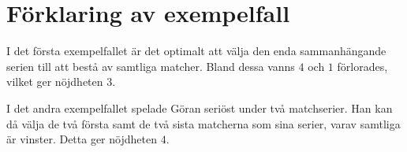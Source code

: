 \section*{Förklaring av exempelfall}
I det första exempelfallet är det optimalt att välja den enda sammanhängande serien till att bestå av samtliga matcher.
Bland dessa vanns $4$ och $1$ förlorades, vilket ger nöjdheten $3$.

I det andra exempelfallet spelade Göran seriöst under två matchserier.
Han kan då välja de två första samt de två sista matcherna som sina serier, varav samtliga är vinster.
Detta ger nöjdheten $4$.
